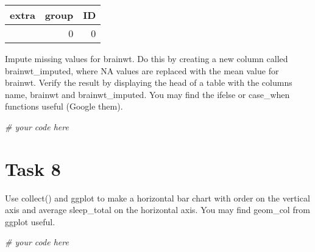 \documentclass[
]{article}
\newenvironment{Shaded}{\begin{snugshade}}{\end{snugshade}}
\newcommand{\CommentTok}[1]{\textcolor[rgb]{0.56,0.35,0.01}{\textit{#1}}}
\begin{document}
\begin{longtable}[]{@{}rrr@{}}
\toprule\noalign{}
extra & group & ID \\
\midrule\noalign{}
\endhead
\bottomrule\noalign{}
\endlastfoot
0 & 0 & 0 \\
\end{longtable}

Impute missing values for brainwt. Do this by creating a new column
called brainwt\_imputed, where NA values are replaced with the mean
value for brainwt. Verify the result by displaying the head of a table
with the columns name, brainwt and brainwt\_imputed. You may find the
ifelse or case\_when functions useful (Google them).

\begin{Shaded}
\begin{Highlighting}[]
\CommentTok{\# your code here}
\end{Highlighting}
\end{Shaded}

\section{Task 8}\label{task-8}

Use collect() and ggplot to make a horizontal bar chart with order on
the vertical axis and average sleep\_total on the horizontal axis. You
may find geom\_col from ggplot useful.

\begin{Shaded}
\begin{Highlighting}[]
\CommentTok{\# your code here}
\end{Highlighting}
\end{Shaded}
\end{document}

